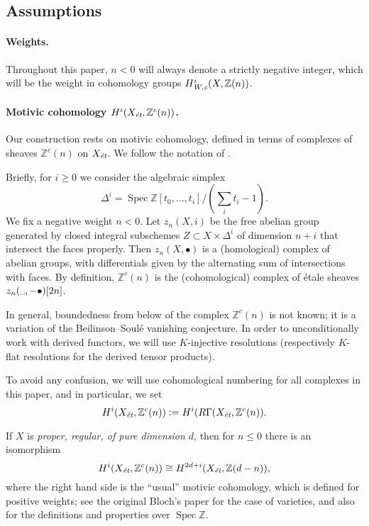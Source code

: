 \documentclass[leqno,12pt]{article}
\theoremstyle{plain}
\theoremstyle{definition}
\DeclareMathOperator{\Spec}{Spec}
\newcommand{\ZZ}{\mathbb{Z}}
\newcommand{\dfn}{\mathrel{\mathop:}=}
\newcommand{\Wc}{\text{\it W,c}}
\newcommand{\et}{\text{\it \'{e}t}}
\begin{document}
\subsection*{Assumptions}

\paragraph{Weights.}
Throughout this paper, $n < 0$ will always denote a strictly negative integer,
which will be the weight in cohomology groups $H^i_\Wc (X, \ZZ(n))$.

\paragraph{Motivic cohomology $H^i (X_\et, \ZZ^c (n))$.}
Our construction rests on motivic cohomology, defined in terms of complexes of
sheaves $\ZZ^c (n)$ on $X_\et$. We follow the notation of \cite{Geisser-2010}.

Briefly, for $i \ge 0$ we consider the algebraic simplex
$$\Delta^i = \Spec \ZZ[t_0,\ldots,t_i]/(\sum_i t_i - 1).$$
We fix a negative weight $n < 0$. Let $z_n (X,i)$ be the free abelian group
generated by closed integral subschemes $Z \subset X \times \Delta^i$ of
dimension $n + i$ that intersect the faces properly. Then $z_n (X, \bullet)$ is
a (homological) complex of abelian groups, with differentials given by the
alternating sum of intersections with faces. By definition, $\ZZ^c (n)$ is the
(cohomological) complex of \'{e}tale sheaves
$z_n (\text{\textvisiblespace}, -\bullet) [2n]$.

In general, boundedness from below of the complex $\ZZ^c(n)$ is not known; it is
a variation of the Beilinson--Soul\'{e} vanishing conjecture. In order to
unconditionally work with derived functors, we will use $K$-injective
resolutions \cite{Spaltenstein-1988,Serpe-2003} (respectively $K$-flat
resolutions for the derived tensor products).

To avoid any confusion, we will use cohomological numbering for all complexes in
this paper, and in particular, we set
$$H^i (X_\et, \ZZ^c(n)) \dfn H^i (R\Gamma (X_\et, \ZZ^c(n)).$$

If $X$ is \emph{proper, regular, of pure dimension $d$}, then for $n \le 0$
there is an isomorphism
\begin{equation}
  \label{eqn:Zc(n)-vs-Z(d-n)}
  H^i (X_\et, \ZZ^c(n)) \cong H^{2d+i} (X_\et, \ZZ (d-n)),
\end{equation}
where the right hand side is the ``usual'' motivic cohomology, which is defined
for positive weights; see the original Bloch's paper \cite{Bloch-1986} for the
case of varieties, and also \cite{Geisser-2004-Dedekind,Geisser-2005} for the
definitions and properties over $\Spec \ZZ$.
\end{document}

